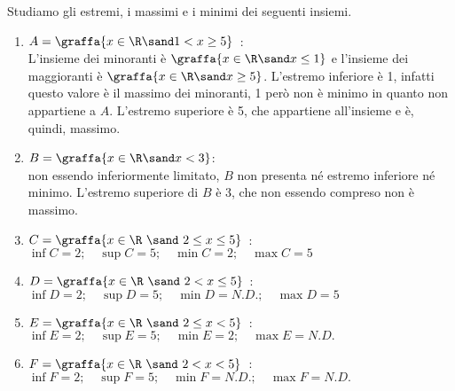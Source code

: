 \begin{esempio}Studiamo gli estremi, i massimi e i minimi dei seguenti 
insiemi. %
\begin{enumerate}
\item \(A = \graffa{x\in\R \sand 1 < x \geq 5}\)~: \\
L'insieme dei minoranti è \(\graffa{x\in\R \sand x \leq 1}\) e
l'insieme dei maggioranti è \(\graffa{x\in\R \sand x \geq 5}\).
L'estremo inferiore è 1, infatti questo valore è il massimo 
dei minoranti, 1 però non è minimo in quanto non appartiene a \(A\). 
L'estremo superiore è 5, che appartiene all'insieme e è, quindi, massimo. 
\item \(B =\graffa{x \in \R \sand x < 3}\): \\
non essendo inferiormente limitato, \(B\) non presenta né estremo inferiore 
né minimo. 
L'estremo superiore di \(B\) è 3, che non essendo compreso non è massimo.
\item \(C = \graffa{x\in\R~\sand~ 2 \leq x \leq 5}\)~: \\
\(\inf{C} = 2; \quad \sup{C} = 5; \quad \min{C} = 2; \quad \max{C} = 5\) 
\item \(D = \graffa{x\in\R~\sand~ 2 < x \leq 5}\)~: \\
\(\inf{D} = 2; \quad \sup{D} = 5; \quad \min{D} = N.D.; \quad \max{D} = 5\)
\item \(E = \graffa{x\in\R~\sand~ 2 \leq x < 5}\)~: \\
\(\inf{E} = 2; \quad \sup{E} = 5; \quad \min{E} = 2; \quad \max{E} = N.D.\)
\item \(F = \graffa{x\in\R~\sand~ 2 < x < 5}\)~: \\
\(\inf{F} = 2; \quad \sup{F} = 5;\quad \min{F} = N.D.;\quad 
  \max{F} = N.D.\)
\end{enumerate}
\end{esempio}

